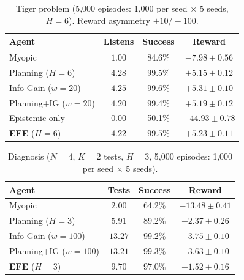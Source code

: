 \documentclass[runningheads]{llncs}
\begin{document}
\begin{table}[h]
\centering
\caption{Tiger problem (5{,}000 episodes: 1{,}000 per seed $\times$ 5 seeds, $H{=}6$). Reward asymmetry $+10 / {-}100$.}
\begin{small}
\begin{tabular}{lccc}
\toprule
Agent & Listens & Success & Reward \\
\midrule
Myopic & $1.00$ & 84.6\% & $-7.98 \pm 0.56$ \\
Planning ($H{=}6$) & $4.28$ & 99.5\% & $+5.15 \pm 0.12$ \\
Info Gain ($w{=}20$) & $4.25$ & 99.6\% & $+5.31 \pm 0.10$ \\
Planning+IG ($w{=}20$) & $4.20$ & 99.4\% & $+5.19 \pm 0.12$ \\
Epistemic-only & $0.00$ & 50.1\% & $-44.93 \pm 0.78$ \\
\textbf{EFE} ($H{=}6$) & $\mathbf{4.22}$ & $\mathbf{99.5\%}$ & $\mathbf{+5.23 \pm 0.11}$ \\
\bottomrule
\end{tabular}
\end{small}
\end{table}

\begin{table}[h]
\centering
\caption{Diagnosis ($N{=}4$, $K{=}2$ tests, $H{=}3$, 5{,}000 episodes: 1{,}000 per seed $\times$ 5 seeds).}
\begin{small}
\begin{tabular}{lccc}
\toprule
Agent & Tests & Success & Reward \\
\midrule
Myopic & $2.00$ & 64.2\% & $-13.48 \pm 0.41$ \\
Planning ($H{=}3$) & $5.91$ & 89.2\% & $-2.37 \pm 0.26$ \\
Info Gain ($w{=}100$) & $13.27$ & 99.2\% & $-3.75 \pm 0.10$ \\
Planning+IG ($w{=}100$) & $13.21$ & 99.3\% & $-3.63 \pm 0.10$ \\
\textbf{EFE} ($H{=}3$) & $\mathbf{9.70}$ & $\mathbf{97.0\%}$ & $\mathbf{-1.52 \pm 0.16}$ \\
\bottomrule
\end{tabular}
\end{small}
\end{table}
\end{document}
